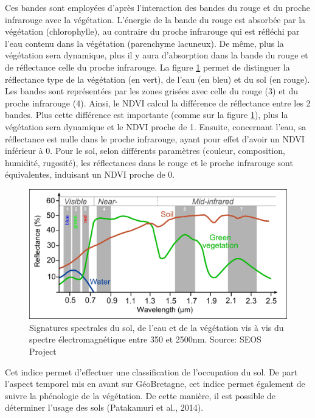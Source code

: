 \documentclass[10pt,a4paper]{article}
\begin{document}
Ces bandes sont employées d'après l’interaction des bandes du rouge et du proche infrarouge avec la végétation. L'énergie de la bande du rouge est absorbée par la végétation (chlorophylle), au contraire du proche infrarouge qui est réfléchi par l'eau contenu dans la végétation (parenchyme lacuneux). De même, plus la végétation sera dynamique, plus il y aura d'absorption dans la bande du rouge et de réflectance celle du proche infrarouge.\smallbreak
La figure \ref{signSpectr} permet de distinguer la réflectance type de la végétation (en vert), de l'eau (en bleu) et du sol (en rouge). Les bandes sont représentées par les zones grisées avec celle du rouge (3) et du proche infrarouge (4). Ainsi, le NDVI calcul la différence de réflectance entre les 2 bandes. Plus cette différence est importante (comme sur la figure \ref{signSpectr}), plus la végétation sera dynamique et le NDVI proche de 1. Ensuite, concernant l'eau, sa réflectance est nulle dans le proche infrarouge, ayant pour effet d'avoir un NDVI inférieur à 0. Pour le sol, selon différents paramètres (couleur, composition, humidité, rugosité), les réflectances dans le rouge et le proche infrarouge sont équivalentes, induisant un NDVI proche de 0.\smallbreak

\begin{figure}[!h]
\centering
\includegraphics[scale=0.4]{img/spectral_signatures.jpg}
\caption{Signatures spectrales du sol, de l'eau et de la végétation vis à vis du spectre électromagnétique entre 350 et 2500nm. Source: SEOS Project}
\label{signSpectr}
\end{figure}

Cet indice permet d'effectuer une classification de l'occupation du sol. De part l'aspect temporel mis en avant sur GéoBretagne, cet indice permet également de suivre la phénologie de la végétation. De cette manière, il est possible de déterminer l'usage des sols (Patakamuri et al., 2014).
\end{document}
